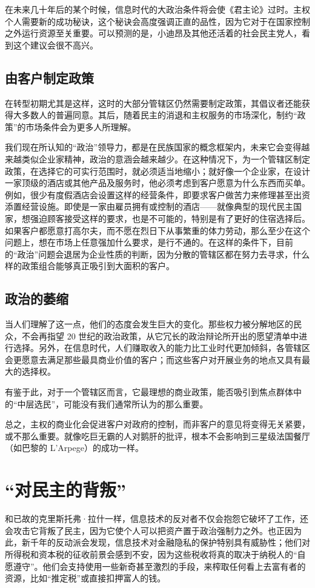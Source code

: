 在未来几十年后的某个时候，信息时代的大政治条件将会使《君主论》过时。主权个人需要新的成功秘诀，这个秘诀会高度强调正直的品性，因为它对于在国家控制之外运行资源至关重要。可以预测的是，小迪昂及其他还活着的社会民主党人，看到这个建议会很不高兴。

\subsection{由客户制定政策}
在转型初期尤其是这样，这时的大部分管辖区仍然需要制定政策，其倡议者还能获得大多数人的普遍同意。其后，随着民主的消退和主权服务的市场深化，制约“政策”的市场条件会为更多人所理解。

我们现在所认知的“政治”领导力，都是在民族国家的概念框架内，未来它会变得越来越类似企业家精神，政治的意涵会越来越少。在这种情况下，为一个管辖区制定政策，在选择它的可实行范围时，就必须适当地缩小；就好像一个企业家，在设计一家顶级的酒店或其他产品及服务时，他必须考虑到客户愿意为什么东西而买单。例如，很少有度假酒店会设置这样的经营条件，即要求客户做苦力来修理甚至出资添置经营设施。即使是一家由雇员拥有或控制的酒店——就像典型的现代民主国家，想强迫顾客接受这样的要求，也是不可能的，特别是有了更好的住宿选择后。如果客户都愿意打高尔夫，而不愿在烈日下从事繁重的体力劳动，那么至少在这个问题上，想在市场上任意强加什么要求，是行不通的。在这样的条件下，目前的“政治”问题会退居为企业性质的判断，因为分散的管辖区都在努力去寻求，什么样的政策组合能够真正吸引到大面积的客户。

\subsection{政治的萎缩}
当人们理解了这一点，他们的态度会发生巨大的变化。那些权力被分解地区的民众，不会再指望 20 世纪的政治政策，从它冗长的政治辩论所开出的愿望清单中进行选择。另外，在信息时代，人们赚取收入的能力比工业时代更加倾斜，各管辖区会更愿意去满足那些最具商业价值的客户；而这些客户对开展业务的地点又具有最大的选择权。

有鉴于此，对于一个管辖区而言，它最理想的商业政策，能否吸引到焦点群体中的“中层选民”，可能没有我们通常所认为的那么重要。

总之，主权的商业化会促进客户对政府的控制，而非客户的意见将变得无关紧要，或不那么重要。就像吃巨无霸的人对鹅肝的批评，根本不会影响到三星级法国餐厅（如巴黎的 L'Arpege）的成功一样。

\section{“对民主的背叛”}
和已故的克里斯托弗·拉什一样，信息技术的反对者不仅会抱怨它破坏了工作，还会攻击它背叛了民主，因为它使个人可以把资产置于政治强制力之外。也正因为此，新千年的反动派会发现，信息技术对金融隐私的保护特别具有威胁性；他们对所得税和资本税的征收前景会感到不安，因为这些税收将真的取决于纳税人的“自愿遵守”。他们会支持使用一些新奇甚至激烈的手段，来榨取任何看上去富有者的资源，比如“推定税”或直接扣押富人的钱。


